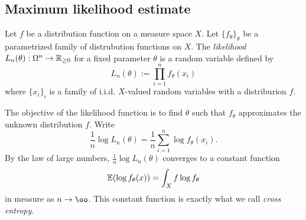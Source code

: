 \documentclass{../exp}
\begin{document}
\subsection{Maximum likelihood estimate}
\begin{defn}
Let $f$ be a distribution function on a measure space $X$.
Let $\{f_\theta\}_\theta$ be a parametrized family of distrubution functions on $X$.
The \emph{likelihood} $L_n(\theta):\Omega^n\to\mathbb{R}_{\ge0}$ for a fixed parameter $\theta$ is a random variable defined by
\[L_n(\theta):=\prod_{i=1}^nf_\theta(x_i)\]
where $\{x_i\}_i$ is a family of i.i.d. $X$-valued random variables with a distriburion $f$.
\end{defn}
The objective of the likelihood function is to find $\theta$ such that $f_\theta$ approximates the unknown distribution $f$.
Write
\[\frac1n\log L_n(\theta)=\frac1n\sum_{i=1}^n\log f_\theta(x_i).\]
By the law of large numbers, $\frac1n\log L_n(\theta)$ converges to a constant function
\[\mathbb{E}(\log f_\theta(x))=\int_Xf\log f_\theta\]
in measure as $n\to\oo$.
This constant function is exactly what we call \emph{cross entropy}.
\end{document}
